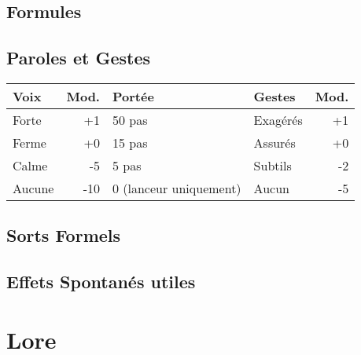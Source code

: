 \magusArtsLong

\subsection*{Formules}
\begin{multicols}{2}
\castingformulas

\begin{small}
\end{small}

\end{multicols}
\subsection*{Paroles et Gestes}
\begin{tabularx}{\textwidth}{|X|r|l||X|r|}
\hline
Voix   & Mod. & Portée                          & Gestes   & Mod. \\ \hline
Forte  &  +1  & 50 pas                          & Exagérés & +1 \\
Ferme  &  +0  & 15 pas                          & Assurés  & +0 \\
Calme  &  -5  & 5 pas                           & Subtils  & -2 \\
Aucune & -10  & 0 {\small (lanceur uniquement)} & Aucun    & -5 \\ \hline
\end{tabularx}
\pagebreak
\subsection*{Sorts Formels}
\begin{multicols}{2}
\longspells
\end{multicols}
\subsection*{Effets Spontanés utiles}

\begin{multicols}{2}

\end{multicols}

\pagebreak

\section*{Lore}

